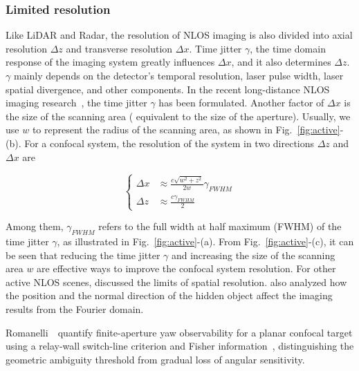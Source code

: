 \subsubsection{Limited resolution}
Like LiDAR and Radar, the resolution of NLOS imaging is also divided into axial resolution $\Delta z$ and transverse resolution $\Delta x$. Time jitter $\gamma$, the time domain response of the imaging system greatly influences $\Delta x$, and it also determines $\Delta z$. $\gamma$ mainly depends on the detector's temporal resolution, laser pulse width, laser spatial divergence, and other components. In the recent long-distance NLOS imaging research~\cite{wuNonLineofsightImaging2021}, the time jitter $\gamma$ has been formulated. Another factor of $\Delta x$ is the size of the scanning area (
equivalent to the size of the aperture). Usually, we use $w$ to represent the radius of the scanning area, as shown in Fig.~\ref{fig:active}-(b). For a confocal system, the resolution of the system in two directions $\Delta z$ and $\Delta x$ are~\cite{otooleConfocalNonlineofsightImaging2018}

\begin{equation}
    \begin{cases}
    \Delta x& \approx \frac{c \sqrt{w^{2}+z^{2}}}{2 w} \gamma_{FWHM}\\
    \Delta z& \approx \frac{c \gamma_{FWHM}}{2}
    \end{cases}
    \label{res}
\end{equation}

Among them, $\gamma_{FWHM}$ refers to the full width at half maximum (FWHM) of the time jitter $\gamma$, as illustrated in Fig.~\ref{fig:active}-(a). From Fig.~\ref{fig:active}-(c), it can be seen that reducing the time jitter $\gamma$ and increasing the size of the scanning area $w$ are effective ways to improve the confocal system resolution.
For other active NLOS scenes, \cite{kadambiOccludedImagingTimeofflight2016,liuAnalysisFeatureVisibility2019,buttafavaNonlineofsightImagingUsing2015} discussed the limits of spatial resolution. \cite{liuAnalysisFeatureVisibility2019} also analyzed how the position and the normal direction of the hidden object affect the imaging results from the Fourier domain.

Romanelli~\etal~quantify finite-aperture yaw observability for a planar confocal target using a relay-wall switch-line criterion and Fisher information~\cite{romanelliFiniteApertureNLOS2026}, distinguishing the geometric ambiguity threshold from gradual loss of angular sensitivity.

